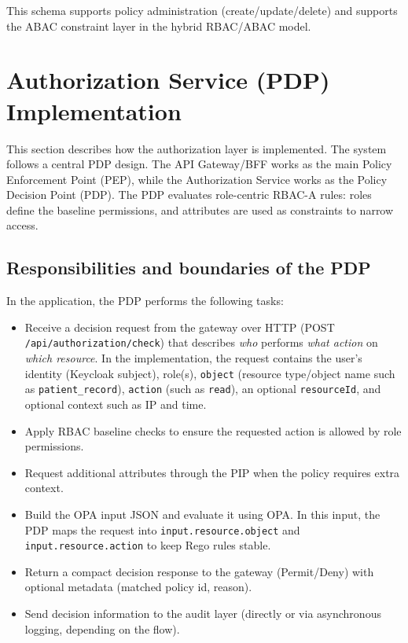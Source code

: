 This schema supports policy administration (create/update/delete) and supports the ABAC constraint layer in the hybrid RBAC/ABAC model.




\section{Authorization Service (PDP) Implementation}
This section describes how the authorization layer is implemented. The system follows a central PDP design. The API Gateway/BFF works as the main Policy Enforcement Point (PEP), while the Authorization Service works as the Policy Decision Point (PDP). The PDP evaluates role-centric RBAC-A rules: roles define the baseline permissions, and attributes are used as constraints to narrow access.


\subsection{Responsibilities and boundaries of the PDP}
In the application, the PDP performs the following tasks:
\begin{itemize}
    \item Receive a decision request from the gateway over HTTP (POST \texttt{/api/authorization/check}) that describes \textit{who} performs \textit{what action} on \textit{which resource}. In the implementation, the request contains the user's identity (Keycloak subject), role(s), \texttt{object} (resource type/object name such as \texttt{patient\_record}), \texttt{action} (such as \texttt{read}), an optional \texttt{resourceId}, and optional context such as IP and time.
    
  \item Apply RBAC baseline checks to ensure the requested action is allowed by role permissions.
  \item Request additional attributes through the PIP when the policy requires extra context. 
      \item Build the OPA input JSON and evaluate it using OPA. In this input, the PDP maps the request into \texttt{input.resource.object} and \texttt{input.resource.action} to keep Rego rules stable.

  \item Return a compact decision response to the gateway (Permit/Deny) with optional metadata (matched policy id, reason).
  \item Send decision information to the audit layer (directly or via asynchronous logging, depending on the flow).
\end{itemize}

